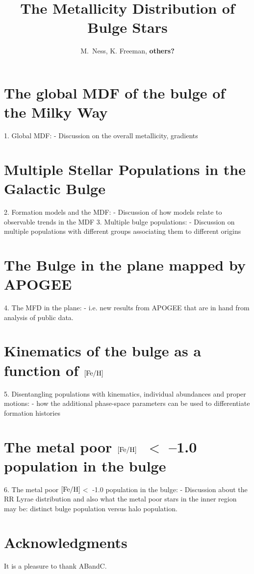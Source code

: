 \documentclass[12pt, preprint]{aastex}
\newcommand{\feh}{\mbox{$\rm [Fe/H]$}}
\begin{document}
\title{The Metallicity Distribution of Bulge Stars}
\author{M.~Ness,
K. Freeman,
\textbf{others?}}


\begin{abstract}%

\end{abstract}


\section{The global MDF of the bulge of the Milky Way} 
1. Global MDF: - Discussion on the overall metallicity, gradients \\

\section{Multiple Stellar Populations in the Galactic Bulge} 


2. Formation models and the MDF: - Discussion of how models relate to observable
trends in the MDF
3. Multiple bulge populations: - Discussion on multiple populations with different
groups associating them to different origins

\section{The Bulge in the plane mapped by APOGEE}



4. The MFD in the plane: - i.e. new results from APOGEE that are in hand from
analysis of public data.
\section{Kinematics of the bulge as a function of \feh}

5. Disentangling populations with kinematics, individual abundances and proper
motions: - how the additional phase-space parameters can be used to differentiate
formation histories

\section{The metal poor \feh\ $<$ --1.0 population in the bulge} 

6. The metal poor \feh $<$ -1.0 population in the bulge: - Discussion about the
RR Lyrae distribution and also what the metal poor stars in the inner region may be: distinct bulge population versus halo population.

\section*{Acknowledgments}
It is a pleasure to thank ABandC.



\end{document}
